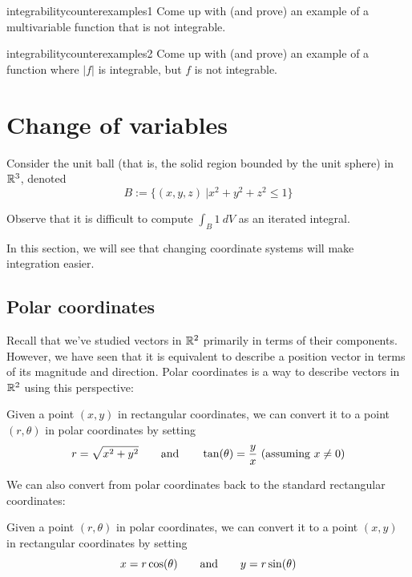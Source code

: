 \begin{problem}{integrabilitycounterexamples1}
Come up with (and prove) an example of a multivariable function that is not integrable.
\end{problem}

\begin{problem}{integrabilitycounterexamples2}
Come up with (and prove) an example of a function where $|f|$ is integrable, but $f$ is not integrable.
\end{problem}

\section{Change of variables}

\begin{motivating}
    Consider the unit ball (that is, the solid region bounded by the unit sphere) in $\mathbb{R}^3$, denoted
    $$B := \{(x,y,z) \ | x^2 + y^2 + z^2 \leq 1\}$$
    
    Observe that it is difficult to compute $\int_B 1 \ dV$ as an iterated integral.  
\end{motivating}

In this section, we will see that changing coordinate systems will make integration easier.

\subsection{Polar coordinates}

Recall that we've studied vectors in $\mathbb{R}^2$ primarily in terms of their components.  However, we have seen that it is equivalent to describe a position vector in terms of its magnitude and direction.  Polar coordinates is a way to describe vectors in $\mathbb{R}^2$ using this perspective:

\begin{definition}
Given a point $(x,y)$ in rectangular coordinates, we can convert it to a point $(r,\theta)$ in polar coordinates by setting 
    $$r = \sqrt{x^2 + y^2} \qquad \textnormal{and} \qquad \tan(\theta) = \frac{y}{x} \ (\textnormal{assuming} \ x \neq 0)$$
\end{definition}

We can also convert from polar coordinates back to the standard rectangular coordinates:     
\begin{definition}
Given a point $(r,\theta)$ in polar coordinates, we can convert it to a point $(x,y)$ in rectangular coordinates by setting 
    $$x = r\cos(\theta) \qquad \textnormal{and} \qquad y = r\sin(\theta)$$
\end{definition}

